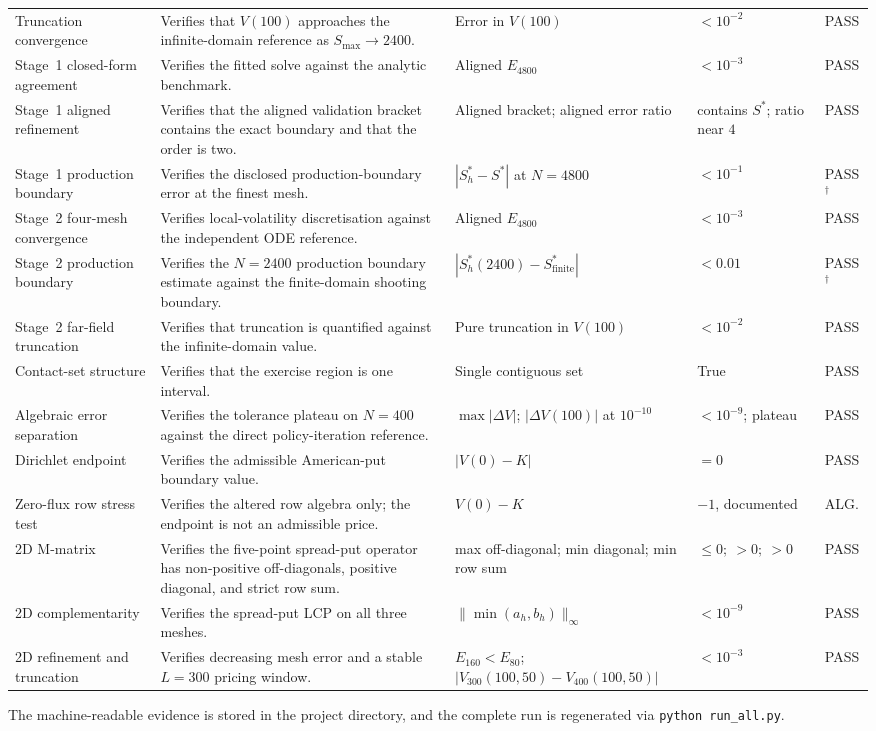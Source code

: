 \documentclass[11pt,a4paper]{article}
\theoremstyle{definition}
\theoremstyle{remark}
\begin{document}
\begin{longtable}{@{}p{}p{}p{}p{}p{}@{}}
Truncation convergence & Verifies that \(V(100)\) approaches the
infinite-domain reference as \(S_{\max}\to2400\). & Error in \(V(100)\) &
\(<10^{-2}\) & PASS \\
Stage~1 closed-form agreement & Verifies the fitted solve against the
analytic benchmark. & Aligned \(E_{4800}\) & \(<10^{-3}\) & PASS \\
Stage~1 aligned refinement & Verifies that the aligned validation bracket
contains the exact boundary and that the order is two. & Aligned bracket;
aligned error ratio & contains \(S^*\); ratio near \(4\) & PASS \\
Stage~1 production boundary & Verifies the disclosed production-boundary
error at the finest mesh. & \(|S_h^*-S^*|\) at \(N=4800\) & \(<10^{-1}\) &
PASS$^{\dagger}$ \\
Stage~2 four-mesh convergence & Verifies local-volatility discretisation
against the independent ODE reference. & Aligned \(E_{4800}\) & \(<10^{-3}\) &
PASS \\
Stage~2 production boundary & Verifies the \(N=2400\) production boundary
estimate against the finite-domain shooting boundary. &
\(|S_h^*(2400)-S_{\mathrm{finite}}^*|\) & \(<0.01\) & PASS$^{\dagger}$ \\
Stage~2 far-field truncation & Verifies that truncation is quantified
against the infinite-domain value. & Pure truncation in \(V(100)\) &
\(<10^{-2}\) & PASS \\
Contact-set structure & Verifies that the exercise region is one interval.
& Single contiguous set & True & PASS \\
Algebraic error separation & Verifies the tolerance plateau on \(N=400\)
against the direct policy-iteration reference. & \(\max|\Delta V|\);
\(|\Delta V(100)|\) at \(10^{-10}\) & \(<10^{-9}\); plateau & PASS \\
Dirichlet endpoint & Verifies the admissible American-put boundary value.
& \(|V(0)-K|\) & \(=0\) & PASS \\
Zero-flux row stress test & Verifies the altered row algebra only; the
endpoint is not an admissible price. & \(V(0)-K\) & \(-1\), documented &
ALG. \\
2D M-matrix & Verifies the five-point spread-put operator has non-positive
off-diagonals, positive diagonal, and strict row sum. & max off-diagonal;
min diagonal; min row sum & \(\le0;\ >0;\ >0\) & PASS \\
2D complementarity & Verifies the spread-put LCP on all three meshes.
& \(\|\min(a_h,b_h)\|_\infty\) & \(<10^{-9}\) & PASS \\
2D refinement and truncation & Verifies decreasing mesh error and a stable
\(L=300\) pricing window. & \(E_{160}<E_{80}\);
\(|V_{300}(100,50)-V_{400}(100,50)|\) & \(<10^{-3}\) & PASS \\
\end{longtable}
\endgroup

\noindent The machine-readable evidence is stored in the project
directory, and the complete run is regenerated via
\texttt{python run\_all.py}.
\end{document}
